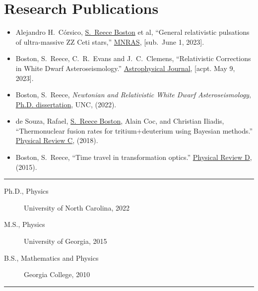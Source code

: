 \documentclass[11pt, letter]{article}
\begin{document}
\section*{Research Publications}
\begin{minipage}{\textwidth}
%
\begin{itemize}
		\item Alejandro H.~C\'orsico, \underline{S.~Reece Boston} et al, 
			``General relativistic pulsations of ultra-massive ZZ Ceti stars,'' 
			\href{}{MNRAS}, 
			[sub.~June 1, 2023].
		\item Boston, S.~Reece, C.~R.~Evans and J.~C.~Clemens, 
			``Relativistic Corrections in White Dwarf Asteroseismology.'' 
			\href{}{Astrophysical Journal}, 
			[acpt. May 9, 2023].
		\item Boston, S.~Reece, 
			\emph{Newtonian and Relativistic White Dwarf Asteroseismology}, 
			\\\href{https://cdr.lib.unc.edu/concern/dissertations/jw827n44n?locale=en}{Ph.D. dissertation}, 
			UNC, (2022).
		\item de Souza, Rafael, \underline{S.~Reece Boston}, Alain Coc, and Christian Iliadis, 
			``Thermonuclear fusion rates for tritium+deuterium using Bayesian methods.''  
			\href{http://journals.aps.org/prc/abstract/10.1103/PhysRevC.99.014619}{Physical Review C}, 
			(2018).
		\item Boston, S.~Reece, 
			``Time travel in transformation optics.''  
			\href{http://journals.aps.org/prd/abstract/10.1103/PhysRevD.91.124035}{Physical Review D}, 
			(2015).
\end{itemize}

\hrule
\end{minipage}
\begin{description}
		\item[Ph.D., Physics] University of North Carolina, 2022
		\item[M.S., Physics] University of Georgia, 2015
		\item[B.S., Mathematics and Physics] Georgia College, 2010
\end{description}
\hrule

\vfill
\mbox{}
\end{document}
